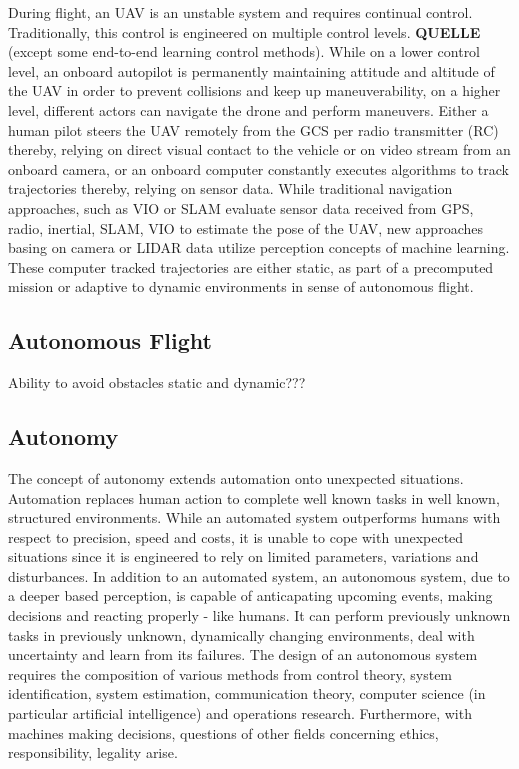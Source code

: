 During flight, an UAV is an unstable system
and requires continual control.
Traditionally, this control is
engineered on multiple control levels.
\textbf{QUELLE}
(except some end-to-end learning control methods).
While on a lower control level,
an onboard autopilot is 
permanently maintaining attitude and altitude of the UAV
in order to prevent 
collisions and keep up maneuverability,
on a higher level, different actors 
can navigate the drone and perform maneuvers.
Either a human pilot steers the UAV remotely from
the GCS per radio transmitter (RC)
thereby, relying on direct visual contact to the vehicle 
or on video stream from an onboard camera,
or an onboard computer constantly executes 
algorithms to track trajectories
thereby, relying on sensor data.
While traditional navigation approaches,
such as VIO or SLAM
evaluate sensor data received from
GPS, radio, inertial, SLAM, VIO
to estimate the pose of the UAV,
new approaches basing
on camera or LIDAR data utilize perception concepts
of machine learning.
These computer tracked trajectories 
are either static,
as part of a
precomputed mission or 
adaptive to dynamic environments
in sense of autonomous flight.


\subsection{Autonomous Flight}

Ability to avoid obstacles
static and dynamic???





\subsection{Autonomy}
The concept of autonomy extends
automation 
onto unexpected situations. 
Automation replaces human action
to complete well known tasks in well known, structured environments.
While an automated system outperforms humans
with respect to 
precision, speed and costs,
it is unable to
cope with unexpected situations
since it is engineered to rely on limited
parameters, variations and disturbances.
In addition to an automated system,
an autonomous system, 
due to a deeper based perception,
is capable of anticapating upcoming events,
making decisions and reacting properly - like humans.
It can perform previously unknown tasks
in previously unknown, dynamically changing environments,
deal with uncertainty and learn from its failures.
The design of an autonomous system
requires the composition of
various methods from 
control theory,
system identification, 
system estimation,
communication theory,
computer science (in particular artificial intelligence)
and
operations research.
Furthermore, with machines making decisions,
questions of other fields concerning
ethics,
responsibility,
legality
arise.


